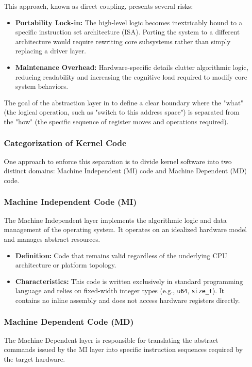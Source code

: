 \documentclass[a4paper,10pt,twoside]{report}
\theoremstyle{definition}
\begin{document}
This approach, known as direct coupling, presents several risks:
\begin{itemize}
    \item \textbf{Portability Lock-in:} The high-level logic becomes inextricably bound to a specific instruction set architecture (ISA). Porting the system to a different architecture would require rewriting core subsystems rather than simply replacing a driver layer.
    \item \textbf{Maintenance Overhead:} Hardware-specific details clutter algorithmic logic, reducing readability and increasing the cognitive load required to modify core system behaviors.
\end{itemize}

The goal of the abstraction layer in to define a clear boundary where the "what" (the logical operation, such as "switch to this address space") is separated from the "how" (the specific sequence of register moves and operations required).

\subsubsection{Categorization of Kernel Code}

One approach to enforce this separation is to divide kernel software into two distinct domains: Machine Independent (MI) code and Machine Dependent (MD) code.

\subsubsection{Machine Independent Code (MI)}
The Machine Independent layer implements the algorithmic logic and data management of the operating system. It operates on an idealized hardware model and manages abstract resources.

\begin{itemize}
    \item \textbf{Definition:} Code that remains valid regardless of the underlying CPU architecture or platform topology.
    \item \textbf{Characteristics:} This code is written exclusively in standard programming language and relies on fixed-width integer types (e.g., \texttt{u64}, \texttt{size\_t}). It contains no inline assembly and does not access hardware registers directly.
\end{itemize}

\subsubsection{Machine Dependent Code (MD)}
The Machine Dependent layer is responsible for translating the abstract commands issued by the MI layer into specific instruction sequences required by the target hardware.
\end{document}
